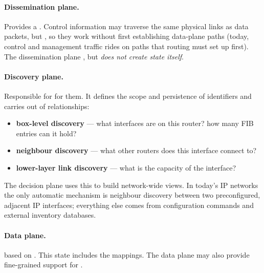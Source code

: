 \paragraph{Dissemination plane.} Provides a . Control information may traverse the same physical links as data packets, but , so they work without first establishing data-plane paths (today, control and management traffic rides on paths that routing must set up first). The dissemination plane , but \emph{does not create state itself}.

\paragraph{Discovery plane.} Responsible for  for them. It defines the scope and persistence of identifiers and carries out  of relationships:
\begin{itemize}
\item \textbf{box-level discovery} --- what interfaces are on this router? how many FIB entries can it hold?
\item \textbf{neighbour discovery} --- what other routers does this interface connect to?
\item \textbf{lower-layer link discovery} --- what is the capacity of the interface?
\end{itemize}
The decision plane uses this to build network-wide views. In today's IP networks the only automatic mechanism is neighbour discovery between two preconfigured, adjacent IP interfaces; everything else comes from configuration commands and external inventory databases.

\paragraph{Data plane.}  based on . This state includes the  mappings. The data plane may also provide fine-grained support for .

